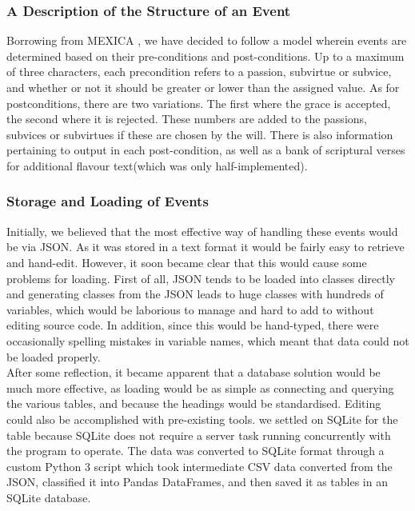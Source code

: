 \documentclass[11pt]{article}
\begin{document}
\subsubsection{A Description of the Structure of an Event}
Borrowing from MEXICA \cite{MEXICA}, we have decided to follow a model wherein events are determined based on their pre-conditions and post-conditions. Up to a maximum of three characters, each precondition refers to a passion, subvirtue or subvice, and whether or not it should be greater or lower than the assigned value. As for postconditions, there are two variations. The first where the grace is accepted, the second where it is rejected. These numbers are added to the passions, subvices or subvirtues if these are chosen by the will. There is also information pertaining to output in each post-condition, as well as a bank of scriptural verses for additional flavour text(which was only half-implemented).\\

\subsubsection{Storage and Loading of Events} 
Initially, we believed that the most effective way of handling these events would be via JSON. As it was stored in a text format it would be fairly easy to retrieve and hand-edit. However, it soon became clear that this would cause some problems for loading. First of all, JSON tends to be loaded into classes directly and generating classes from the JSON leads to huge classes with hundreds of variables, which would be laborious to manage and hard to add to without editing source code. In addition, since this would be hand-typed, there were occasionally spelling mistakes in variable names, which meant that data could not be loaded properly.\\

After some reflection, it became apparent that a database solution would be much more effective, as loading would be as simple as connecting and querying the various tables, and because the headings would be standardised. Editing could also be accomplished with pre-existing tools. we settled on SQLite for the table because SQLite does not require a server task running concurrently with the program to operate. The data was converted to SQLite format through a custom Python 3 script which took intermediate CSV data converted from the JSON, classified it into Pandas DataFrames, and then saved it as tables in an SQLite database.\\
\end{document}
